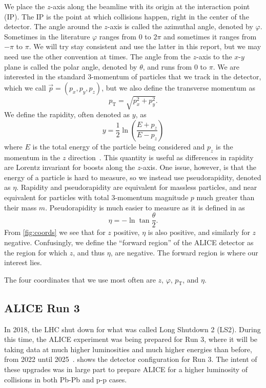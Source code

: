 We place the $z$-axis along the beamline with its origin at the interaction point (IP). The IP is the point at which collisions happen, right in the center of the detector. The angle around the $z$-axis is called the azimuthal angle, denoted by $\varphi$. Sometimes in the literature $\varphi$ ranges from 0 to $2\pi$ and sometimes it ranges from $-\pi$ to $\pi$. We will try stay consistent and use the latter in this report, but we may need use the other convention at times. The angle from the $z$-axis to the $x$-$y$ plane is called the polar angle, denoted by $\theta$, and runs from 0 to $\pi$. We are interested in the standard 3-momentum of particles that we track in the detector, which we call $\vec{p}=(p_x,p_y,p_z)$, but we also define the transverse momentum as 
\begin{equation}
    p_{\mathrm{T}}=\sqrt{p_x^2 + p_y^2}.
    \label{eqn:transverse momentum}
\end{equation}
We define the rapidity, often denoted as $y$, as
\begin{equation}
    y=\frac 12 \ln\left(\frac{E+p_z}{E-p_z}\right)
    \label{eqn:rapidity}
\end{equation}
where $E$ is the total energy of the particle being considered and $p_z$ is the momentum in the $z$ direction~\cite{kar_exp_phys}. This quantity is useful as differences in rapidity are Lorentz invariant for boosts along the $z$-axis. One issue, however, is that the energy of a particle is hard to measure, so we instead use pseudorapidity, denoted as $\eta$. Rapidity and pseudorapidity are equivalent for massless particles, and near equivalent for particles with total 3-momentum magnitude $p$ much greater than their mass $m$. Pseudorapidity is much easier to measure as it is defined in \cite{kar_exp_phys} as
\begin{equation}
    \eta=-\ln\tan\frac{\theta}{2}.
    \label{eqn:pseudorapidity}
\end{equation}
From \cref{fig:coords} we see that for $z$ positive, $\eta$ is also positive, and similarly for $z$ negative. Confusingly, we define the ``forward region'' of the ALICE detector as the region for which $z$, and thus $\eta$, are negative. The forward region is where our interest lies.

The four coordinates that we use most often are $z$, $\varphi$, $p_\mathrm{T}$, and $\eta$. 

\subsection{ALICE Run 3}
In 2018, the LHC shut down for what was called Long Shutdown 2 (LS2). During this time, the ALICE experiment was being prepared for Run 3, where it will be taking data at much higher luminosities and much higher energies than before, from 2022 until 2025~\cite{ALICE_Upgrade_LOI}.  shows the detector configuration for Run 3. The intent of these upgrades was in large part to prepare ALICE for a higher luminosity of collisions in both Pb-Pb and p-p cases. 

